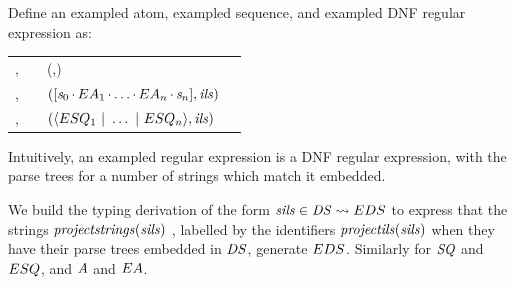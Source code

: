 \documentclass[acmsmall]{acmart}
\begin{document}
\begin{definition}
  Define an exampled atom, exampled sequence, and exampled DNF regular expression as:
  \begin{center}
    \begin{tabular}{l@{\ }c@{\ }l@{\ }>{\itshape\/}r}
      \ExampledAtom{},\ExampledAtomAlt{} & \GEq{} & (\StarOf{\ExampledDNFRegex{}},\IntListSet{})
      \\
      \ExampledSequence{},\ExampledSequenceAlt{} & \GEq{} &
                                                            $([\mathit{s}_0\mkern-1mu\cdot\mkern-1muEA_1\mkern-1mu\cdot\mkern-1mu\ldots\mkern-1mu\cdot\mkern-1muEA_n\mkern-1mu\cdot\mkern-1mu\mathit{s}_n],\mathit{ils})$
      \\
      \ExampledDNFRegex{},\ExampledDNFRegexAlt{} & \GEq{} &
                                                            $(\langle ESQ_1~|~\ldots~|~ESQ_n\rangle,\mathit{ils})$ %
    \end{tabular}
  \end{center}
\end{definition}

Intuitively, an exampled regular expression is a DNF regular expression, with the
parse trees for a number of strings which match it embedded.

We build the
typing derivation of the form
$\mathit{sils} \in \mathit{DS}
\rightsquigarrow EDS$ to express that the strings
$\mathit{\mathit{projectstrings}(\mathit{sils})}$
, labelled by the identifiers
$\mathit{\mathit{projectils}(\mathit{sils})}$ when they have their parse trees embedded in
$\mathit{DS}$, generate $EDS$.
Similarly for $\mathit{SQ}$ and $ESQ$, and $\mathit{A}$ and
$EA$.
\end{document}
